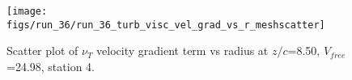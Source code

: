\begin{figure}[H]
\centering
\texttt{[image: figs/run\_36/run\_36\_turb\_visc\_vel\_grad\_vs\_r\_meshscatter]}
\caption{Scatter plot of $\nu_T$ velocity gradient term vs radius at $z/c$=8.50, $V_{free}$=24.98, station 4.}
\label{fig:run_36_turb_visc_vel_grad_vs_r_meshscatter}
\end{figure}



